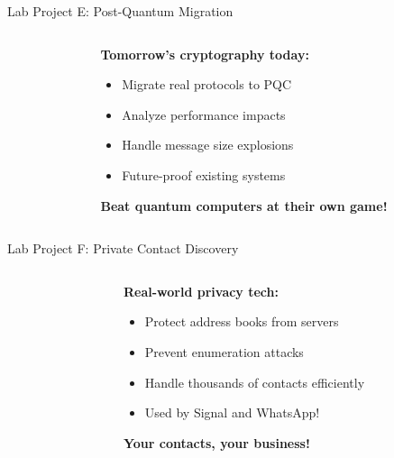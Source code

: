 \documentclass[aspectratio=169, lualatex, handout]{beamer}
\begin{document}
\begin{frame}{Lab Project E: Post-Quantum Migration}
	\begin{columns}[c]
		\begin{column}{0.5\textwidth}
		\end{column}
		\begin{column}{0.5\textwidth}
			\textbf{Tomorrow's cryptography today:}
			\begin{itemize}[<+->]
				\item Migrate real protocols to PQC
				\item Analyze performance impacts
				\item Handle message size explosions
				\item Future-proof existing systems
			\end{itemize}
			\vspace{0.5cm}
			\textcolor{cipherprimary}{\textbf{Beat quantum computers at their own game!}}
		\end{column}
	\end{columns}
\end{frame}

\begin{frame}{Lab Project F: Private Contact Discovery}
	\begin{columns}[c]
		\begin{column}{0.5\textwidth}
		\end{column}
		\begin{column}{0.5\textwidth}
			\textbf{Real-world privacy tech:}
			\begin{itemize}[<+->]
				\item Protect address books from servers
				\item Prevent enumeration attacks
				\item Handle thousands of contacts efficiently
				\item Used by Signal and WhatsApp!
			\end{itemize}
			\vspace{0.5cm}
			\textcolor{cipherprimary}{\textbf{Your contacts, your business!}}
		\end{column}
	\end{columns}
\end{frame}
\end{document}
